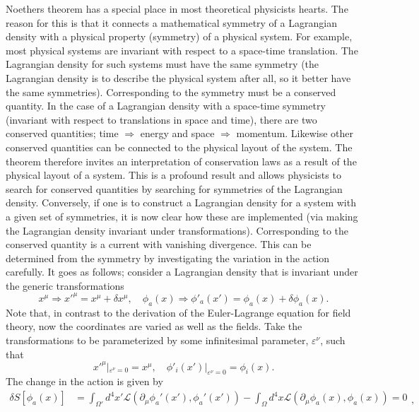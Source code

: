 Noethers theorem has a special place in most theoretical physicists hearts. The reason for this is that it connects a mathematical symmetry of a Lagrangian density with a physical property (symmetry) of a physical system. For example, most physical systems are invariant with respect to a space-time translation. The Lagrangian density for such systems must have the same symmetry (the Lagrangian density is to describe the physical system after all, so it better have the same symmetries). Corresponding to the symmetry must be a conserved quantity. In the case of a Lagrangian density with a space-time symmetry (invariant with respect to translations in space and time), there are two conserved quantities; time $\Rightarrow$ energy and space $\Rightarrow$ momentum. Likewise other conserved quantities can be connected to the physical layout of the system. The theorem therefore invites an interpretation of conservation laws as a result of the physical layout of a system. This is a profound result and allows physicists to search for conserved quantities by searching for symmetries of the Lagrangian density. Conversely, if one is to construct a Lagrangian density for a system with a given set of symmetries, it is now clear how these are implemented (via making the Lagrangian density invariant under transformations). \newline  
Corresponding to the conserved quantity is a current with vanishing divergence. This can be determined from the symmetry by investigating the variation in the action carefully. It goes as follows; consider a Lagrangian density that is invariant under the generic transformations
\begin{equation}
	x^\mu\Rightarrow {x'}^{\mu}=x^\mu+\delta x^\mu, \quad \phi_a(x)\Rightarrow \phi'_a(x')=\phi_a(x)+\delta \phi_a(x).
\end{equation} 
Note that, in contrast to the derivation of the Euler-Lagrange equation for field theory, now the coordinates are varied as well as the fields. Take the transformations to be parameterized by some infinitesimal parameter, $\varepsilon^\nu$, such that
\begin{equation}
	{x'}^\mu|_{\varepsilon^\nu=0}=x^\mu, \quad \phi'_i(x')|_{\varepsilon^\nu=0}=\phi_i(x).
\end{equation} 
The change in the action is given by
\begin{equation}
	\begin{split}
		\delta S[\phi_a(x)]&= \int_{\Omega'} d^4x' \mathcal{L}(\partial_\mu\phi_a'(x'),\phi_a'(x'))-\int_{\Omega}d^4x\mathcal{L}(\partial_\mu\phi_a(x),\phi_a(x))=0\\
	\end{split},
	\label{k}
\end{equation} 
